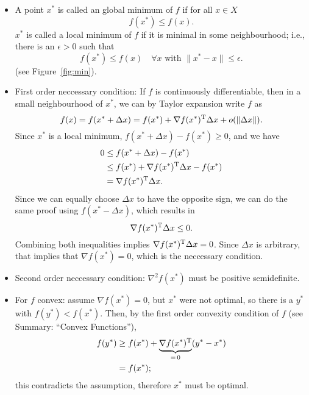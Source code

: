 \documentclass{article}
\begin{document}
\begin{itemize}
\item A point \(x^*\) is called an global minimum of \(f\) if for all \(x \in X\)
  \begin{equation*}
    f(x^*) \leq f(x).
  \end{equation*}
  \(x^*\) is called a local minimum of \(f\) if it is minimal in some neighbourhood; i.e., there is
  an \(\epsilon > 0\) such that
  \begin{equation*}
    f(x^*) \leq f(x) \quad \forall x \text{ with } \lVert x^* - x \rVert \leq \epsilon.
  \end{equation*}
  (see Figure~\ref{fig:min}).
\item First order neccessary condition: If \(f\) is continuously differentiable, then in a small
  neighbourhood of \(x^*\), we can by Taylor expansion write \(f\) as
  \begin{equation*}
    f(x) = f(x^* + \Delta x) = f(x^*) + \nabla f(x^*)^{\mathrm{T}} \Delta x + o(\lVert \Delta x \rVert).
  \end{equation*}
  Since \(x^*\) is a local minimum, \(f(x^* + \Delta x) - f(x^*) \geq 0\), and we have
  \begin{align*}
    0 &\leq f(x^* + \Delta x) - f(x^*) \\
      &\leq f(x^*) + \nabla f(x^*)^{\mathrm{T}} \Delta x - f(x^*) \\
      &= \nabla f(x^*)^{\mathrm{T}} \Delta x.
  \end{align*}
  Since we can equally choose \(\Delta x\) to have the opposite sign, we can do the same proof using
  \(f(x^* - \Delta x)\), which results in
  \begin{equation*}
    \nabla f(x^*)^{\mathrm{T}} \Delta x \leq 0.
  \end{equation*}
  Combining both inequalities implies \(\nabla f(x^*)^{\mathrm{T}} \Delta x = 0\).  Since \(\Delta x\) is
  arbitrary, that implies that \(\nabla f(x^*) = 0\), which is the neccessary condition.
\item Second order neccessary condition: \(\nabla^2 f(x^*)\) must be positive semidefinite.
\item For \(f\) convex: assume \(\nabla f(x^*) = 0\), but \(x^*\) were not optimal, so there is a
  \(y^*\) with \(f(y^*) < f(x^*)\).  Then, by the first order convexity condition of \(f\) (see
  Summary: ``Convex Functions''),
\begin{align*}
  f(y^*) &\geq f(x^*) + \underbrace{\nabla f(x^*)^{\mathrm{T}}}_{=\, 0}(y^* - x^*) \\
         &= f(x^*);
\end{align*}
this contradicts the assumption, therefore \(x^*\) must be optimal.
\end{itemize}
\end{document}

